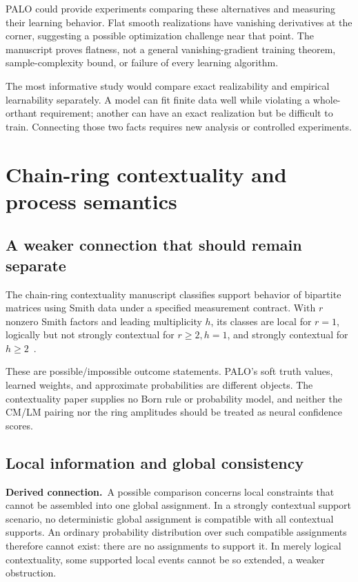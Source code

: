 \documentclass[11pt,a4paper]{article}
\theoremstyle{remark}
\newcommand{\derived}{\textbf{Derived connection.}\ }
\begin{document}
PALO could provide experiments comparing these alternatives and measuring their learning behavior. Flat smooth realizations have vanishing derivatives at the corner, suggesting a possible optimization challenge near that point. The manuscript proves flatness, not a general vanishing-gradient training theorem, sample-complexity bound, or failure of every learning algorithm.

The most informative study would compare exact realizability and empirical learnability separately. A model can fit finite data well while violating a whole-orthant requirement; another can have an exact realization but be difficult to train. Connecting those two facts requires new analysis or controlled experiments.

\section{Chain-ring contextuality and process semantics}
\subsection{A weaker connection that should remain separate}
The chain-ring contextuality manuscript classifies support behavior of bipartite matrices using Smith data under a specified measurement contract. With $r$ nonzero Smith factors and leading multiplicity $h$, its classes are local for $r=1$, logically but not strongly contextual for $r\ge2,h=1$, and strongly contextual for $h\ge2$~\cite[Abstract and Section 3]{context}.

These are possible/impossible outcome statements. PALO's soft truth values, learned weights, and approximate probabilities are different objects. The contextuality paper supplies no Born rule or probability model, and neither the CM/LM pairing nor the ring amplitudes should be treated as neural confidence scores.

\subsection{Local information and global consistency}
\derived A possible comparison concerns local constraints that cannot be assembled into one global assignment. In a strongly contextual support scenario, no deterministic global assignment is compatible with all contextual supports. An ordinary probability distribution over such compatible assignments therefore cannot exist: there are no assignments to support it. In merely logical contextuality, some supported local events cannot be so extended, a weaker obstruction.
\end{document}
